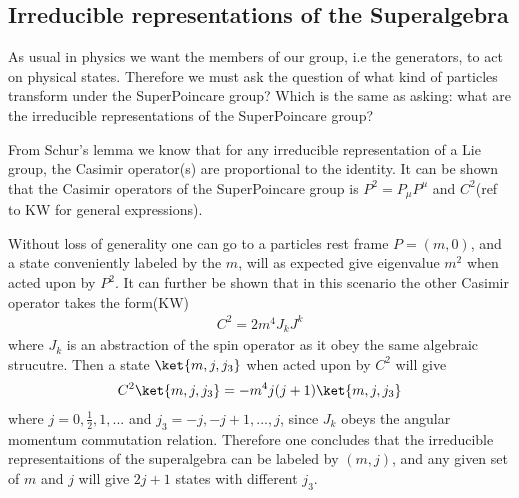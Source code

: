\subsection{Irreducible representations of the Superalgebra}
As usual in physics we want the members of our group, i.e the generators, to act on physical states. Therefore we must ask the question of what kind of particles transform under the SuperPoincare group? Which is the same as asking: what are the irreducible representations of the SuperPoincare group?

From Schur's lemma we know that for any irreducible representation of a Lie group, the Casimir operator(s) are proportional to the identity. It can be shown that the Casimir operators of the SuperPoincare group is $P^{2}=P_{\mu}P^{\mu}$ and $C^{2}$(ref to KW for general expressions).

Without loss of generality one can go to a particles rest frame $P=(m,0)$, and a state conveniently labeled by the $m$, will as expected give eigenvalue $m^{2}$ when acted upon by $P^{2}$. It can further be shown that in this scenario the other Casimir operator takes the form(KW)
\begin{align}
    C^{2}=2m^{4}J_{k}J^{k}
\end{align}
where $J_k$ is an abstraction of the spin operator as it obey the same algebraic strucutre. Then a state $\ket{m,j,j_{3}}$ when acted upon by $C^{2}$ will give
\begin{align}
    C^{2}\ket{m,j,j_3}=-m^{4}j(j+1)\ket{m,j,j_3}
\end{align}
where $j=0,\frac{1}{2},1,...$ and $j_3=-j,-j+1,...,j$, since $J_k$ obeys the angular momentum commutation relation. Therefore one concludes that the irreducible representaitions of the superalgebra can be labeled by $(m,j)$, and any given set of $m$ and $j$ will give $2j+1$ states with different $j_3$.

